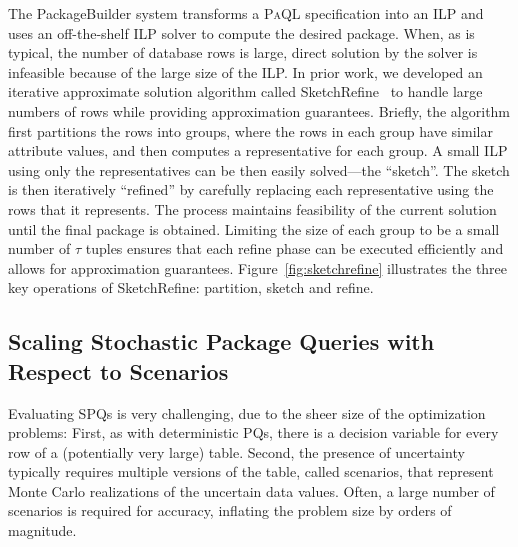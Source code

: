 \documentclass[11pt]{article}
\newcommand{\paql}{\textsc{PaQL}\xspace}
\newcommand{\skref}{{\sc SketchRefine}\xspace}
\begin{document}
   The PackageBuilder system transforms a \paql specification into an ILP and uses an off-the-shelf ILP solver to compute the desired package. When, as is typical, the number of database rows is large, direct solution by the solver is infeasible because of the large size of the ILP. In prior work, we developed an iterative approximate solution algorithm called \skref~\cite{BrucatoBAM16} to handle large numbers of rows while providing approximation guarantees. Briefly, the algorithm first partitions the rows into groups, where the rows in each group have similar attribute values, and then computes a representative for each group. A small ILP using only the representatives can be then easily solved---the ``sketch''. The sketch is then iteratively ``refined'' by carefully replacing each representative using the rows that it represents.  The process maintains feasibility of the current solution until the final package is obtained. Limiting the size of each group to be a small number of $\tau$ tuples ensures that each refine phase can be executed efficiently and allows for approximation guarantees. Figure~\ref{fig:sketchrefine} illustrates the three key operations of \skref: partition, sketch and refine.
   
\subsection{Scaling Stochastic Package Queries with Respect to Scenarios}
   \label{sec:spqNew}
   
Evaluating SPQs is very challenging, due to the sheer size of the optimization problems: First, as with deterministic PQs, there is a decision variable for every row of a (potentially very large) table. Second, the presence of uncertainty typically requires multiple versions of the table, called scenarios, that represent Monte Carlo realizations of the uncertain data values. Often, a large number of scenarios is required for accuracy, inflating the problem size by orders of magnitude. 
\end{document}
